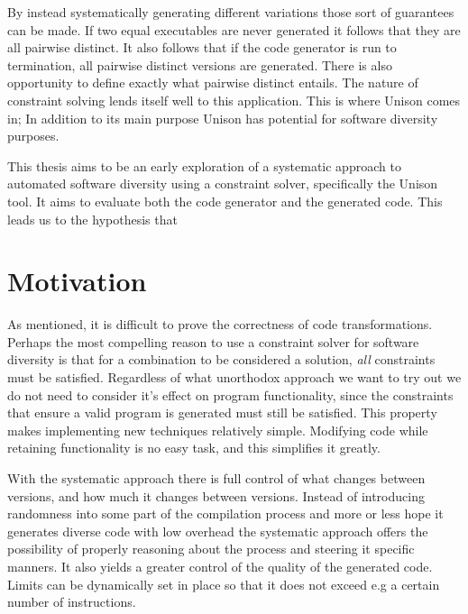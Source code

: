 By instead systematically generating different variations those sort of guarantees can be
made. If two equal executables are never generated it follows that they are all pairwise
distinct. It also follows that if the code generator is run to termination, all pairwise
distinct versions are generated. There is also opportunity to define exactly what pairwise
distinct entails. The nature of constraint solving lends itself well to this application.
This is where Unison comes in; In addition to its main purpose Unison has potential for
software diversity purposes.

This thesis aims to be an early exploration of a systematic approach to automated software
diversity using a constraint solver, specifically the Unison tool. It aims to evaluate
both the code generator and the generated code. This leads us to the hypothesis that


\section{Motivation}

As mentioned, it is difficult to prove the correctness of code transformations. Perhaps
the most compelling reason to use a constraint solver for software diversity is that for
a combination to be considered a solution, \textit{all} constraints must be satisfied.
Regardless of what unorthodox approach we want to try out we do not need to consider it's
effect on program functionality, since the constraints that ensure a valid program is
generated must still be satisfied. This property makes implementing new techniques
relatively simple. Modifying code while retaining functionality is no easy task, and this
simplifies it greatly.

With the systematic approach there is full control of what changes between versions, and
how much it changes between versions. Instead of introducing randomness into some part of
the compilation process and more or less hope it generates diverse code with low overhead
the systematic approach offers the possibility of properly reasoning about the process and
steering it specific manners. It also yields a greater control of the quality of the
generated code. Limits can be dynamically set in place so that it does not exceed e.g a
certain number of instructions.

